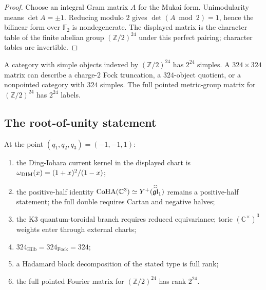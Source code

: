 \begin{proof}
Choose an integral Gram matrix \(A\) for the Mukai form.  Unimodularity
means \(\det A=\pm1\).  Reducing modulo \(2\) gives
\(\det(A\bmod 2)=1\), hence the bilinear form over \(\mathbb F_2\) is
nondegenerate.  The displayed matrix is the character table of the
finite abelian group \((\mathbb Z/2)^{24}\) under this perfect pairing;
character tables are invertible.
\end{proof}

\begin{corollary}
\label{cor:qtet-324-vs-2-24}
A category with simple objects indexed by
\((\mathbb Z/2)^{24}\) has \(2^{24}\) simples.  A
\(324\times324\) matrix can describe a charge-\(2\) Fock truncation,
a \(324\)-object quotient, or a nonpointed category with \(324\)
simples.  The full pointed metric-group matrix for
\((\mathbb Z/2)^{24}\) has \(2^{24}\) labels.
\end{corollary}

\subsection{The root-of-unity statement}
\label{subsec:qtet-root-unity-statement}

\begin{theorem}[The \(N=2\) specialisation]
\label{thm:qtet-proved-n2}
At the point \((q_1,q_2,q_3)=(-1,-1,1)\):
\begin{enumerate}[label=\textup{(\roman*)}]
\item the Ding-Iohara current kernel in the displayed chart is
\(\omega_{\mathrm{DIM}}(x)=(1+x)^2/(1-x)\);
\item the positive-half identity
\(\mathrm{CoHA}(\mathbb C^3)\simeq Y^+(\widehat{\widehat{\mathfrak{gl}}}_1)\) remains a positive-half
statement; the full double requires Cartan and negative halves;
\item the K3 quantum-toroidal branch requires reduced equivariance;
toric \((\mathbb C^\times)^3\) weights enter through external charts;
\item \(324_{\mathrm{Hilb}}=324_{\mathrm{Fock}}=324\);
\item a Hadamard block decomposition of the stated type is full rank;
\item the full pointed Fourier matrix for
\((\mathbb Z/2)^{24}\) has rank \(2^{24}\).
\end{enumerate}
\end{theorem}

